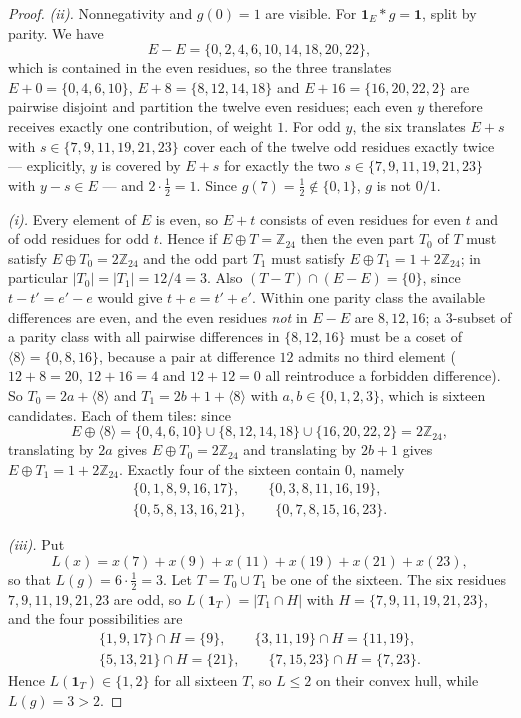 \documentclass[11pt]{amsart}
\theoremstyle{definition}
\theoremstyle{remark}
\newcommand{\Zn}[1]{\mathbb Z_{#1}}
\newcommand{\one}{\mathbf 1}
\begin{document}
\begin{proof}
\emph{(ii).} Nonnegativity and $g(0)=1$ are visible. For $\one_E*g=\one$, split
by parity. We have
\[
  E-E=\{0,2,4,6,10,14,18,20,22\},
\]
which is contained in the even residues, so the three translates
$E+0=\{0,4,6,10\}$, $E+8=\{8,12,14,18\}$ and $E+16=\{16,20,22,2\}$ are pairwise
disjoint and partition the twelve even residues; each even $y$ therefore
receives exactly one contribution, of weight $1$. For odd $y$, the six
translates $E+s$ with $s\in\{7,9,11,19,21,23\}$ cover each of the twelve odd
residues exactly twice --- explicitly, $y$ is covered by $E+s$ for exactly the
two $s\in\{7,9,11,19,21,23\}$ with $y-s\in E$ --- and $2\cdot\tfrac12=1$. Since
$g(7)=\tfrac12\notin\{0,1\}$, $g$ is not $0/1$.

\emph{(i).} Every element of $E$ is even, so $E+t$ consists of even residues for
even $t$ and of odd residues for odd $t$. Hence if $E\oplus T=\Zn{24}$ then the
even part $T_0$ of $T$ must satisfy $E\oplus T_0=2\Zn{24}$ and the odd part
$T_1$ must satisfy $E\oplus T_1=1+2\Zn{24}$; in particular
$|T_0|=|T_1|=12/4=3$. Also $(T-T)\cap(E-E)=\{0\}$, since $t-t'=e'-e$ would give
$t+e=t'+e'$. Within one parity class the available differences are even, and the
even residues \emph{not} in $E-E$ are $8,12,16$; a $3$-subset of a parity class
with all pairwise differences in $\{8,12,16\}$ must be a coset of
$\langle8\rangle=\{0,8,16\}$, because a pair at difference $12$ admits no third
element ($12+8=20$, $12+16=4$ and $12+12=0$ all reintroduce a forbidden
difference). So $T_0=2a+\langle8\rangle$ and $T_1=2b+1+\langle8\rangle$ with
$a,b\in\{0,1,2,3\}$, which is sixteen candidates. Each of them tiles: since
\[
  E\oplus\langle 8\rangle=\{0,4,6,10\}\cup\{8,12,14,18\}\cup\{16,20,22,2\}
  =2\Zn{24},
\]
translating by $2a$ gives $E\oplus T_0=2\Zn{24}$ and translating by $2b+1$ gives
$E\oplus T_1=1+2\Zn{24}$. Exactly four of the sixteen contain $0$, namely
\begin{gather*}
  \{0,1,8,9,16,17\},\qquad\{0,3,8,11,16,19\},\\
  \{0,5,8,13,16,21\},\qquad\{0,7,8,15,16,23\}.
\end{gather*}

\emph{(iii).} Put
\[
  L(x)=x(7)+x(9)+x(11)+x(19)+x(21)+x(23),
\]
so that $L(g)=6\cdot\tfrac12=3$. Let $T=T_0\cup T_1$ be one of the sixteen. The
six residues $7,9,11,19,21,23$ are odd, so $L(\one_T)=|T_1\cap H|$ with
$H=\{7,9,11,19,21,23\}$, and the four possibilities are
\begin{gather*}
  \{1,9,17\}\cap H=\{9\},\qquad
  \{3,11,19\}\cap H=\{11,19\},\\
  \{5,13,21\}\cap H=\{21\},\qquad
  \{7,15,23\}\cap H=\{7,23\}.
\end{gather*}
Hence $L(\one_T)\in\{1,2\}$ for all sixteen $T$, so $L\le2$ on their convex
hull, while $L(g)=3>2$.
\end{proof}
\end{document}
